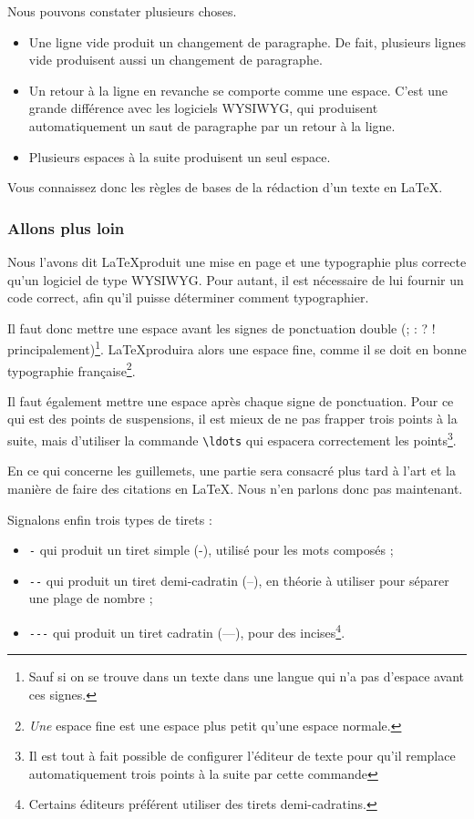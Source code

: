 Nous pouvons constater plusieurs choses.
\begin{itemize}
\item Une ligne vide produit un changement de paragraphe. De fait, plusieurs lignes vide produisent aussi un changement de paragraphe.
\item Un retour à la ligne en revanche se comporte comme une espace. C'est une grande différence avec les logiciels WYSIWYG, qui produisent automatiquement un saut de paragraphe par un retour à la ligne.
\item Plusieurs espaces à la suite produisent un seul espace. 
\end{itemize}

Vous connaissez donc les règles de bases de la rédaction d'un texte en \LaTeX.

\subsubsection{Allons plus loin}


Nous l'avons dit \LaTeX produit une mise en page et une typographie plus correcte qu'un logiciel de type WYSIWYG. Pour autant, il est nécessaire de lui fournir un code correct, afin qu'il puisse déterminer comment typographier.

Il faut donc mettre une espace avant les signes de ponctuation double (; : ? ! principalement)\footnote{Sauf si on se trouve dans un texte dans une langue qui n'a pas d'espace avant ces signes.}. \LaTeX produira alors une espace fine, comme il se doit en bonne typographie fran\c caise\footnote{\emph{Une} espace fine est une espace plus petit qu'une espace normale.}.

Il faut également mettre une espace après chaque signe de ponctuation. Pour ce qui est des points de suspensions, il est mieux de ne pas frapper trois points à la suite, mais d'utiliser la commande \verb|\ldots| qui espacera correctement les points\footnote{Il est tout à fait possible de configurer l'éditeur de texte pour qu'il remplace automatiquement trois points à la suite par cette commande}.

En ce qui concerne les guillemets, une partie sera consacré plus tard à l'art et la manière de faire des citations en \LaTeX. Nous n'en parlons donc pas maintenant.

Signalons enfin trois types de tirets :
\begin{itemize}
\item \verb|-| qui produit un tiret simple (-), utilisé pour les mots composés ;
\item \verb|--| qui produit un tiret demi-cadratin (--), en théorie à utiliser pour séparer une plage de nombre ;
\item \verb|---| qui produit un tiret cadratin (---), pour des incises\footnote{Certains éditeurs préférent utiliser des tirets demi-cadratins.}.
\end{itemize}
 
